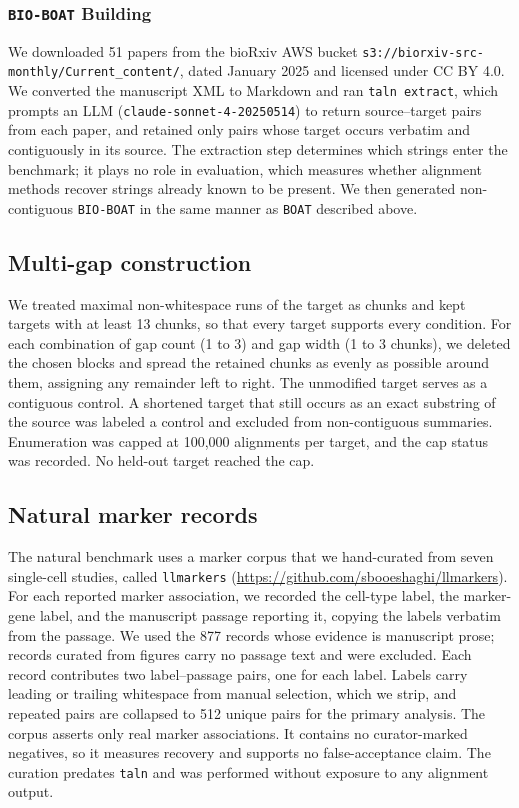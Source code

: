 \documentclass[10pt,twocolumn]{article}
\theoremstyle{plain}
\theoremstyle{definition}
\theoremstyle{remark}
\begin{document}
\subsubsection{\texttt{BIO-BOAT} Building}
We downloaded 51 papers from the bioRxiv AWS bucket \texttt{s3://biorxiv-src-monthly/Current\_content/}, dated January 2025 and licensed under CC BY 4.0. We converted the manuscript XML to Markdown and ran \texttt{taln extract}, which prompts an LLM (\texttt{claude-sonnet-4-20250514}) to return source–target pairs from each paper, and retained only pairs whose target occurs verbatim and contiguously in its source. The extraction step determines which strings enter the benchmark; it plays no role in evaluation, which measures whether alignment methods recover strings already known to be present. We then generated non-contiguous \texttt{BIO-BOAT} in the same manner as \texttt{BOAT} described above.

\subsection{Multi-gap construction}
We treated maximal non-whitespace runs of the target as chunks and kept targets with at least 13 chunks, so that every target supports every condition. For each combination of gap count (1 to 3) and gap width (1 to 3 chunks), we deleted the chosen blocks and spread the retained chunks as evenly as possible around them, assigning any remainder left to right. The unmodified target serves as a contiguous control. A shortened target that still occurs as an exact substring of the source was labeled a control and excluded from non-contiguous summaries. Enumeration was capped at 100,000 alignments per target, and the cap status was recorded. No held-out target reached the cap.

\subsection{Natural marker records}
The natural benchmark uses a marker corpus that we hand-curated from seven single-cell studies, called \texttt{llmarkers} (\href{https://github.com/sbooeshaghi/llmarkers}{https://github.com/sbooeshaghi/llmarkers}). For each reported marker association, we recorded the cell-type label, the marker-gene label, and the manuscript passage reporting it, copying the labels verbatim from the passage. We used the 877 records whose evidence is manuscript prose; records curated from figures carry no passage text and were excluded. Each record contributes two label--passage pairs, one for each label. Labels carry leading or trailing whitespace from manual selection, which we strip, and repeated pairs are collapsed to 512 unique pairs for the primary analysis. The corpus asserts only real marker associations. It contains no curator-marked negatives, so it measures recovery and supports no false-acceptance claim. The curation predates \texttt{taln} and was performed without exposure to any alignment output.
\end{document}
